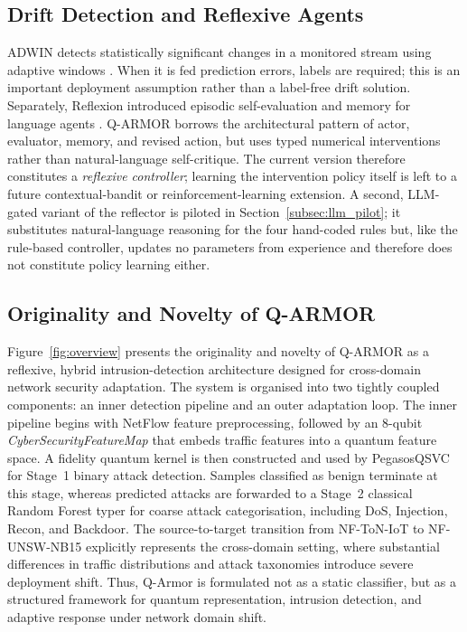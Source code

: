 \documentclass[conference]{IEEEtran}
\begin{document}
\subsection{Drift Detection and Reflexive Agents}

ADWIN detects statistically significant changes in a monitored stream
using adaptive windows \cite{bifet2007}. When it is fed prediction errors,
labels are required; this is an important deployment assumption rather
than a label-free drift solution. Separately, Reflexion introduced
episodic self-evaluation and memory for language agents \cite{shinn2023}.
Q-ARMOR borrows the architectural pattern of actor, evaluator, memory, and
revised action, but uses typed numerical interventions rather than
natural-language self-critique. The current version therefore constitutes
a \emph{reflexive controller}; learning the intervention policy itself is
left to a future contextual-bandit or reinforcement-learning extension. A
second, LLM-gated variant of the reflector is piloted in
Section~\ref{subsec:llm_pilot}; it substitutes natural-language reasoning
for the four hand-coded rules but, like the rule-based controller, updates
no parameters from experience and therefore does not constitute policy
learning either.

\subsection{Originality and Novelty of Q-ARMOR}

Figure~\ref{fig:overview} presents the originality and novelty of Q-ARMOR
as a reflexive, hybrid intrusion-detection architecture designed for
cross-domain network security adaptation. The system is organised into two
tightly coupled components: an inner detection pipeline and an outer
adaptation loop. The inner pipeline begins with NetFlow feature
preprocessing, followed by an 8-qubit \textit{CyberSecurityFeatureMap}
that embeds traffic features into a quantum feature space. A fidelity
quantum kernel is then constructed and used by PegasosQSVC for Stage~1
binary attack detection. Samples classified as benign terminate at this
stage, whereas predicted attacks are forwarded to a Stage~2 classical
Random Forest typer for coarse attack categorisation, including DoS,
Injection, Recon, and Backdoor. The source-to-target transition from
NF-ToN-IoT to NF-UNSW-NB15 explicitly represents the cross-domain setting,
where substantial differences in traffic distributions and attack
taxonomies introduce severe deployment shift. Thus, Q-Armor is formulated
not as a static classifier, but as a structured framework for quantum
representation, intrusion detection, and adaptive response under network
domain shift.
\end{document}
